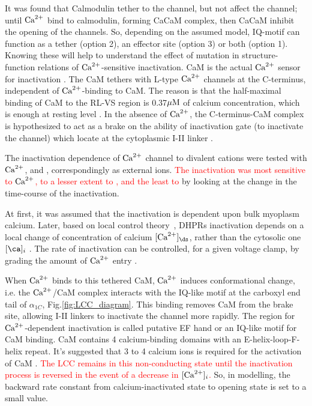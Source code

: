 It was found that Calmodulin tether to the channel, but not affect the channel;
until ${\text{Ca}^{2+}}$ bind to calmodulin, forming CaCaM complex, then CaCaM inhibit the
opening of the channels. So, depending on the assumed model, IQ-motif can
function as a tether (option 2), an effector site (option 3) or both (option 1).
Knowing these will help to understand the effect of mutation in
structure-function relations of ${\text{Ca}^{2+}}$-sensitive inactivation.
CaM is the actual ${\text{Ca}^{2+}}$ sensor for inactivation \citep{peterson1999}. The CaM
tethers with L-type ${\text{Ca}^{2+}}$ channels at the C-terminus, independent of
${\text{Ca}^{2+}}$-binding to CaM. The reason is that the half-maximal binding of CaM to the
RL-VS region is 0.37${\mu\text{M}}$ of calcium concentration, which is enough at resting
level \citep{qin1999}. In the absence of ${\text{Ca}^{2+}}$, the C-terminus-CaM complex is
hypothesized to act as a brake on the ability of inactivation gate (to
inactivate the channel) which locate at the cytoplasmic I-II linker
\citep{mahajan2008}.

\begin{framed}
The inactivation dependence of ${\text{Ca}^{2+}}$ channel to divalent cations were
tested with ${\text{Ca}^{2+}}$,  and , correspondingly as
external ions. \textcolor{red}{The inactivation was most sensitive to ${\text{Ca}^{2+}}$, to
a lesser extent to , and the least to } by looking
at the change in the time-course of the inactivation.
\end{framed}


\begin{framed}
At first, it was assumed that the inactivation is dependent upon bulk myoplasm
calcium. Later, based on local control theory~\citep{wier1994lce}, DHPRs
inactivation depends on a local change of concentration of calcium $[\Ca]_\ds$,
rather than the cytosolic one $[\ca]_i$
\citep{bers1991ecc,cheng1993cse}.  The rate of inactivation can be
controlled, for a given voltage clamp, by grading the amount of ${\text{Ca}^{2+}}$
entry \citep{wier1999}. 

\end{framed}

When ${\text{Ca}^{2+}}$ binds to this tethered CaM, ${\text{Ca}^{2+}}$ induces conformational change, i.e.
the ${\text{Ca}^{2+}}$/CaM complex interacts with the IQ-like motif at the carboxyl end
tail of $\alpha_{1C}$, Fig.\ref{fig:LCC_diagram}. This binding removes CaM from the
brake site, allowing I-II linkers to inactivate the channel more rapidly. The
region for ${\text{Ca}^{2+}}$-dependent inactivation is called putative EF hand or an IQ-like
motif for CaM binding. CaM contains 4 calcium-binding domains with an
E-helix-loop-F-helix repeat. It's suggested that 3 to 4 calcium ions is required
for the activation of CaM \citep{cox1988}. \textcolor{red}{The LCC remains in
this non-conducting state until the inactivation process is reversed in the
event of a decrease in $[{\text{Ca}^{2+}}]_i$.} So, in modelling, the backward rate constant
from calcium-inactivated state to opening state is set to a small value.

